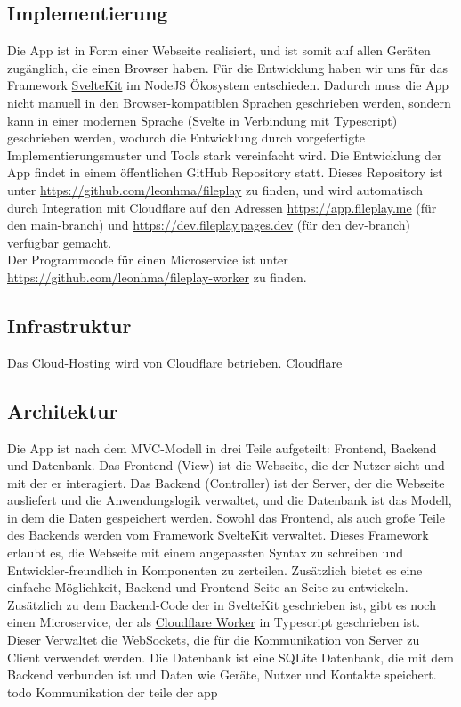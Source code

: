 \documentclass[a4paper]{article}
\begin{document}
\subsection{Implementierung}
Die App ist in Form einer Webseite realisiert, und ist somit auf allen Geräten
zugänglich, die einen Browser haben. Für die Entwicklung haben wir uns für das
Framework \href{https://kit.svelte.dev/}{SvelteKit} im NodeJS Ökosystem
entschieden. Dadurch muss die App nicht manuell in den Browser-kompatiblen
Sprachen geschrieben werden, sondern kann in einer modernen Sprache (Svelte in
Verbindung mit Typescript) geschrieben werden, wodurch die Entwicklung durch
vorgefertigte Implementierungsmuster und Tools stark vereinfacht wird. Die
Entwicklung der App findet in einem öffentlichen GitHub Repository statt. Dieses
Repository ist unter \url{https://github.com/leonhma/fileplay} zu finden, und
wird automatisch durch Integration mit Cloudflare auf den Adressen
\url{https://app.fileplay.me} (für den {main}-branch) und
\url{https://dev.fileplay.pages.dev} (für den {dev}-branch) verfügbar gemacht.\\
Der Programmcode für einen Microservice ist unter
\\\url{https://github.com/leonhma/fileplay-worker} zu finden.

\subsection{Infrastruktur}

Das Cloud-Hosting wird von Cloudflare betrieben. Cloudflare 

\subsection{Architektur}
Die App ist nach dem MVC-Modell in drei Teile aufgeteilt: Frontend, Backend und
Datenbank. Das Frontend (View) ist die Webseite, die der Nutzer sieht und mit
der er interagiert. Das Backend (Controller) ist der Server, der die Webseite
ausliefert und die Anwendungslogik verwaltet, und die Datenbank ist das Modell,
in dem die Daten gespeichert werden. Sowohl das Frontend, als auch große Teile
des Backends werden vom Framework SvelteKit verwaltet. Dieses Framework erlaubt
es, die Webseite mit einem angepassten Syntax zu schreiben und
Entwickler-freundlich in Komponenten zu zerteilen. Zusätzlich bietet es eine
einfache Möglichkeit, Backend und Frontend Seite an Seite zu entwickeln.
Zusätzlich zu dem Backend-Code der in SvelteKit geschrieben ist, gibt es noch
einen Microservice, der als \href{https://workers.cloudflare.com/}{Cloudflare
  Worker} in Typescript geschrieben ist. Dieser Verwaltet die WebSockets, die für die Kommunikation
von Server zu Client verwendet werden. Die Datenbank ist eine SQLite Datenbank,
die mit dem Backend verbunden ist und Daten wie Geräte, Nutzer und Kontakte speichert.\\
todo Kommunikation der teile der app
\end{document}
